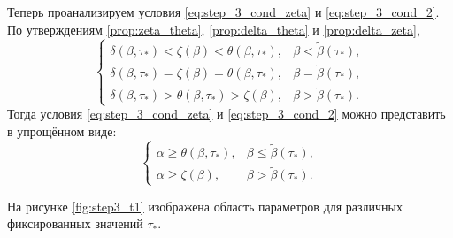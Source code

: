 Теперь проанализируем условия \eqref{eq:step_3_cond_zeta} и \eqref{eq:step_3_cond_2}. По утверждениям \ref{prop:zeta_theta}, \ref{prop:delta_theta} и \ref{prop:delta_zeta},
\begin{equation}
	\begin{cases}
		\delta(\beta, \tau_*) < \zeta(\beta) < \theta(\beta, \tau_*), & \beta < \tilde{\beta}(\tau_*),\\
		\delta(\beta, \tau_*) = \zeta(\beta) = \theta(\beta, \tau_*), & \beta = \tilde{\beta}(\tau_*),\\
		\delta(\beta, \tau_*) > \theta(\beta, \tau_*) > \zeta(\beta), & \beta > \tilde{\beta}(\tau_*).
	\end{cases}
\end{equation}
%
Тогда условия \eqref{eq:step_3_cond_zeta} и \eqref{eq:step_3_cond_2} можно представить в упрощённом виде:
\begin{equation}
	\label{eq:zeta_theta_cond}
	\begin{cases}
		\alpha \geq \theta(\beta, \tau_*), & \beta \leq \tilde{\beta}(\tau_*),\\
		\alpha \geq \zeta(\beta), & \beta > \tilde{\beta}(\tau_*).
	\end{cases}
\end{equation}


На рисунке \ref{fig:step3_t1} изображена область параметров для различных фиксированных значений $\tau_*$.

